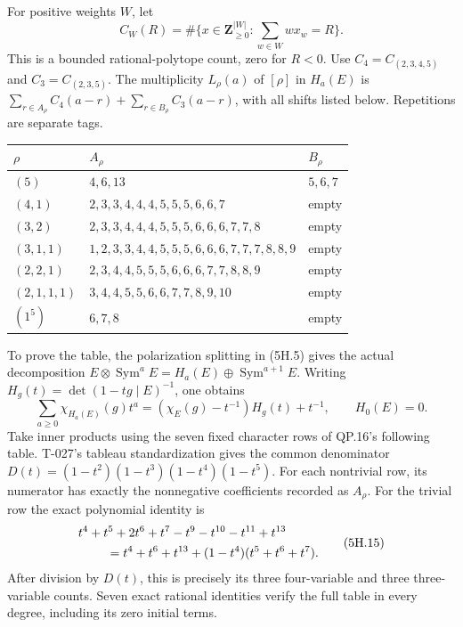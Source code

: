 \documentclass[
  10pt,
]{article}
\begin{document}
For positive weights \(W\), let \[
C_W(R)=\#\{x\in\mathbf Z_{\ge0}^{|W|}:\sum_{w\in W}wx_w=R\}.
\tag{5H.13}
\] This is a bounded rational-polytope count, zero for \(R<0\). Use
\(C_4=C_{(2,3,4,5)}\) and \(C_3=C_{(2,3,5)}\). The multiplicity
\(L_\rho(a)\) of \([\rho]\) in \(H_a(E)\) is
\(\sum_{r\in A_\rho}C_4(a-r)+\sum_{r\in B_\rho}C_3(a-r)\), with all
shifts listed below. Repetitions are separate tags.

\begin{longtable}[]{@{}lll@{}}
\toprule\noalign{}
\(\rho\) & \(A_\rho\) & \(B_\rho\) \\
\midrule\noalign{}
\endhead
\bottomrule\noalign{}
\endlastfoot
\((5)\) & \(4,6,13\) & \(5,6,7\) \\
\((4,1)\) & \(2,3,3,4,4,4,5,5,5,6,6,7\) & empty \\
\((3,2)\) & \(2,3,3,4,4,4,5,5,5,6,6,6,7,7,8\) & empty \\
\((3,1,1)\) & \(1,2,3,3,4,4,5,5,5,6,6,6,7,7,7,8,8,9\) & empty \\
\((2,2,1)\) & \(2,3,4,4,5,5,5,6,6,6,7,7,8,8,9\) & empty \\
\((2,1,1,1)\) & \(3,4,4,5,5,6,6,7,7,8,9,10\) & empty \\
\((1^5)\) & \(6,7,8\) & empty \\
\end{longtable}

To prove the table, the polarization splitting in (5H.5) gives the
actual decomposition
\(E\otimes\operatorname{Sym}^aE=H_a(E)\oplus\operatorname{Sym}^{a+1}E\).
Writing \(H_g(t)=\det(1-tg\mid E)^{-1}\), one obtains \[
\sum_{a\ge0}\chi_{H_a(E)}(g)t^a
=(\chi_E(g)-t^{-1})H_g(t)+t^{-1},\qquad H_0(E)=0.
\tag{5H.14}
\] Take inner products using the seven fixed character rows of QP.16's
following table. T-027's tableau standardization gives the common
denominator \(D(t)=(1-t^2)(1-t^3)(1-t^4)(1-t^5)\). For each nontrivial
row, its numerator has exactly the nonnegative coefficients recorded as
\(A_\rho\). For the trivial row the exact polynomial identity is \[
\begin{aligned}
&t^4+t^5+2t^6+t^7-t^9-t^{10}-t^{11}+t^{13}\\
&\hspace{8mm}=t^4+t^6+t^{13}+(1-t^4)(t^5+t^6+t^7).
\end{aligned}
\tag{5H.15}
\] After division by \(D(t)\), this is precisely its three four-variable
and three three-variable counts. Seven exact rational identities verify
the full table in every degree, including its zero initial terms.
\end{document}
